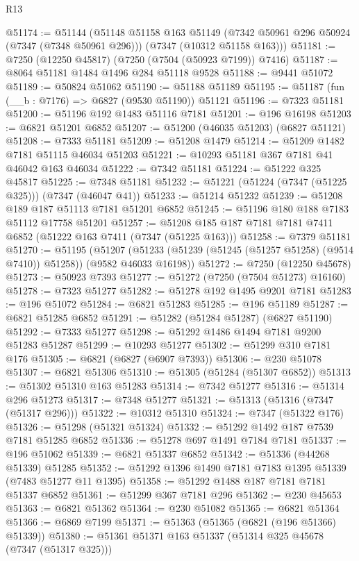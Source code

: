 \begin{lexlean}{R13}
\begin{coremodule}
@51174 := @51144
    (@51148
      @51158
      @163
      @51149
      (@7342 @50961 @296 @50924 (@7347 (@7348 @50961 @296)))
      (@7347 (@10312 @51158 @163)))
@51181 := @7250 (@12250 @45817) (@7250 (@7504 (@50923 @7199)) @7416)
@51187 := @8064 @51181 @1484 @1496 @284 @51118 @9528
@51188 := @9441 @51072
@51189 := @50824 @51062
@51190 := @51188 @51189
@51195 := @51187 (fun (__b : @7176) => @6827 (@9530 @51190)) @51121
@51196 := @7323 @51181
@51200 := @51196 @192 @1483 @51116 @7181
@51201 := @196 @16198
@51203 := @6821 @51201 @6852
@51207 := @51200 (@46035 @51203) (@6827 @51121)
@51208 := @7333 @51181
@51209 := @51208 @1479
@51214 := @51209 @1482 @7181 @51115 @46034 @51203
@51221 := @10293 @51181 @367 @7181 @41 @46042 @163 @46034
@51222 := @7342 @51181
@51224 := @51222 @325 @45817
@51225 := @7348 @51181
@51232 := @51221 (@51224 (@7347 (@51225 @325))) (@7347 (@46047 @41))
@51233 := @51214 @51232
@51239 := @51208 @189 @187 @51113 @7181 @51201 @6852
@51245 := @51196 @180 @188 @7183 @51112 @17758 @51201
@51257 := @51208 @185 @187 @7181 @7181 @7411 @6852 (@51222 @163 @7411 (@7347 (@51225 @163)))
@51258 := @7379 @51181
@51270 := @51195
    (@51207 (@51233 (@51239 (@51245 (@51257 @51258) (@9514 @7410)) @51258)) (@9582 @46033 @16198))
@51272 := @7250 (@12250 @45678)
@51273 := @50923 @7393
@51277 := @51272 (@7250 (@7504 @51273) @16160)
@51278 := @7323 @51277
@51282 := @51278 @192 @1495 @9201 @7181
@51283 := @196 @51072
@51284 := @6821 @51283
@51285 := @196 @51189
@51287 := @6821 @51285 @6852
@51291 := @51282 (@51284 @51287) (@6827 @51190)
@51292 := @7333 @51277
@51298 := @51292 @1486 @1494 @7181 @9200 @51283 @51287
@51299 := @10293 @51277
@51302 := @51299 @310 @7181 @176
@51305 := @6821 (@6827 (@6907 @7393))
@51306 := @230 @51078
@51307 := @6821 @51306
@51310 := @51305 (@51284 (@51307 @6852))
@51313 := @51302 @51310 @163 @51283
@51314 := @7342 @51277
@51316 := @51314 @296 @51273
@51317 := @7348 @51277
@51321 := @51313 (@51316 (@7347 (@51317 @296)))
@51322 := @10312 @51310
@51324 := @7347 (@51322 @176)
@51326 := @51298 (@51321 @51324)
@51332 := @51292 @1492 @187 @7539 @7181 @51285 @6852
@51336 := @51278 @697 @1491 @7184 @7181
@51337 := @196 @51062
@51339 := @6821 @51337 @6852
@51342 := @51336 (@44268 @51339) @51285
@51352 := @51292 @1396 @1490 @7181 @7183 @1395 @51339 (@7483 @51277 @11 @1395)
@51358 := @51292 @1488 @187 @7181 @7181 @51337 @6852
@51361 := @51299 @367 @7181 @296
@51362 := @230 @45653
@51363 := @6821 @51362
@51364 := @230 @51082
@51365 := @6821 @51364
@51366 := @6869 @7199
@51371 := @51363 (@51365 (@6821 (@196 @51366) @51339))
@51380 := @51361 @51371 @163 @51337 (@51314 @325 @45678 (@7347 (@51317 @325)))

\end{coremodule}
\end{lexlean}
